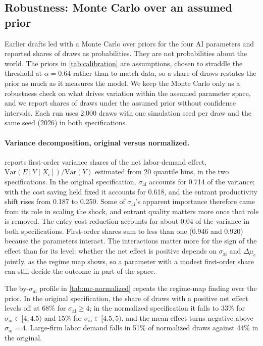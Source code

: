 \subsection{Robustness: Monte Carlo over an assumed prior}\label{sec:sim-mc}

Earlier drafts led with a Monte Carlo over priors for the four AI parameters and reported shares of draws as probabilities.
They are not probabilities about the world.
The priors in \cref{tab:calibration} are assumptions, chosen to straddle the threshold at $\alpha = 0.64$ rather than to match data, so a share of draws restates the prior as much as it measures the model.
We keep the Monte Carlo only as a robustness check on what drives variation within the assumed parameter space, and we report shares of draws under the assumed prior without confidence intervals.
Each run uses 2,000 draws with one simulation seed per draw and the same seed (2026) in both specifications.

\paragraph{Variance decomposition, original versus normalized.}
 reports first-order variance shares of the net labor-demand effect, $\mathrm{Var}(E[Y \mid X_i])/\mathrm{Var}(Y)$ estimated from 20 quantile bins, in the two specifications.
In the original specification, $\sigma_{\text{ai}}$ accounts for 0.714 of the variance; with the cost saving held fixed it accounts for 0.618, and the entrant productivity shift rises from 0.187 to 0.250.
Some of $\sigma_{\text{ai}}$'s apparent importance therefore came from its role in scaling the shock, and entrant quality matters more once that role is removed.
The entry-cost reduction accounts for about 0.04 of the variance in both specifications.
First-order shares sum to less than one (0.946 and 0.920) because the parameters interact.
The interactions matter more for the sign of the effect than for its level: whether the net effect is positive depends on $\sigma_{\text{ai}}$ and $\Delta\mu_e$ jointly, as the regime map shows, so a parameter with a modest first-order share can still decide the outcome in part of the space.

The by-$\sigma_{\text{ai}}$ profile in \cref{tab:mc-normalized} repeats the regime-map finding over the prior.
In the original specification, the share of draws with a positive net effect levels off at 68\% for $\sigma_{\text{ai}} \ge 4$; in the normalized specification it falls to 33\% for $\sigma_{\text{ai}} \in [4, 4.5)$ and 15\% for $\sigma_{\text{ai}} \in [4.5, 5)$, and the mean effect turns negative above $\sigma_{\text{ai}} = 4$.
Large-firm labor demand falls in 51\% of normalized draws against 44\% in the original.

